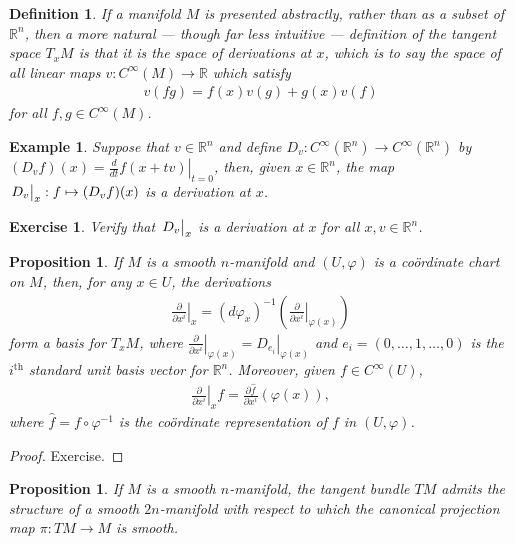 \documentclass{amsart}          %
\newtheorem{proposition}[theorem]{Proposition}
\newtheorem{definition}[theorem]{Definition}
\newtheorem{example}[theorem]{Example}
\newtheorem{exercise}[theorem]{Exercise}
\newcommand{\R}{\mathbb R}
\newcommand{\pdiff}[2]{\frac{\partial #1}{\partial #2}}
\newcommand{\diff}[2]{\frac{d #1}{d #2}}
\begin{document}
\begin{definition}
	If a manifold $M$ is presented abstractly, rather than as a subset of $\R^n$, then a more natural --- though far 
	less intuitive --- definition of the tangent space $T_xM$ is that it is the \textit{space of derivations at $x$}, 
	which is to say the space of all linear maps $v:C^\infty(M)\to\R$ which satisfy\begin{align*}
	v(fg)=f(x)v(g)+g(x)v(f)
	\end{align*}for all $f,g\in C^\infty(M)$.
\end{definition}
\begin{example}
	Suppose that $v\in\R^n$ and define $D_v:C^\infty(\R^n)\to C^\infty(\R^n)$ by $(D_vf)(x)=\left.\diff{}{t}f(x+tv)\right|_{t=0}$, then, given $x\in\R^n$, the map $\left.D_v\vphantom{\diff{}{x}}\right|_x:f\mapsto (D_vf)(x)$ is a derivation at $x$.
\end{example}
\begin{exercise}
	Verify that $\left.D_v\vphantom{\diff{}{x}}\right|_x$ is a derivation at $x$ for all $x,v\in\R^n$.
\end{exercise}
\begin{proposition}
	If $M$ is a smooth $n$-manifold and $(U,\varphi)$ is a co\"{o}rdinate chart on $M$, then, for any $x\in U$, the derivations\begin{align*}
	\left.\pdiff{}{x^i}\right|_x=\left(d\varphi_x\right)^{-1}\left(\left.\pdiff{}{x^i}\right|_{\varphi(x)}\right)
	\end{align*}form a basis for $T_xM$, where $\left.\pdiff{}{x^i}\right|_{\varphi(x)}=\left.D_{e_i}\right|_{\varphi(x)}$ and $e_i=(0,\dots,1,\dots,0)$ is the $i^\text{th}$ standard unit basis vector for $\R^n$. Moreover, given $f\in C^\infty(U)$,\begin{align*}
	\left.\pdiff{}{x^i}\right|_xf=\pdiff{\widehat{f}}{x^i}(\varphi(x)),
	\end{align*}where $\widehat{f}=f\circ\varphi^{-1}$ is the co\"{o}rdinate representation of $f$ in $(U,\varphi)$.
\end{proposition}
\begin{proof}
	Exercise.
\end{proof}
\begin{proposition}
	If $M$ is a smooth $n$-manifold, the tangent bundle $TM$ admits the structure of a smooth $2n$-manifold with respect to which the canonical projection map $\pi:TM\to M$ is smooth.
\end{proposition}
\end{document}
